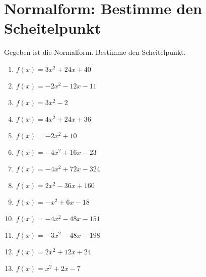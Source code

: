 \documentclass{article}%
\begin{document}
\section{Normalform: Bestimme den Scheitelpunkt}%
\label{sec:NormalformBestimmedenScheitelpunkt}%
Gegeben ist die Normalform. Bestimme den Scheitelpunkt.%
\begin{enumerate}[label=\alph*)]%
\item%
\newline\vspace{0.5cm} $f(x)=3x^2 + 24x + 40$%
\item%
\newline\vspace{0.5cm} $f(x)=-2x^2 - 12x - 11$%
\item%
\newline\vspace{0.5cm} $f(x)=3x^2 - 2$%
\item%
\newline\vspace{0.5cm} $f(x)=4x^2 + 24x + 36$%
\item%
\newline\vspace{0.5cm} $f(x)=-2x^2 + 10$%
\item%
\newline\vspace{0.5cm} $f(x)=-4x^2 + 16x - 23$%
\item%
\newline\vspace{0.5cm} $f(x)=-4x^2 + 72x - 324$%
\item%
\newline\vspace{0.5cm} $f(x)=2x^2 - 36x + 160$%
\item%
\newline\vspace{0.5cm} $f(x)=-x^2 + 6x - 18$%
\item%
\newline\vspace{0.5cm} $f(x)=-4x^2 - 48x - 151$%
\item%
\newline\vspace{0.5cm} $f(x)=-3x^2 - 48x - 198$%
\item%
\newline\vspace{0.5cm} $f(x)=2x^2 + 12x + 24$%
\item%
\newline\vspace{0.5cm} $f(x)=x^2 + 2x - 7$%

\end{enumerate}
\end{document}
